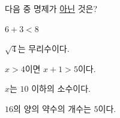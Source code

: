 다음 중 명제가 \underline{아닌} 것은?
\begin{choicesv}{\rule[-3ex]{0pt}{8ex}$6+3<8$}{\rule[-3ex]{0pt}{8ex}$\sqrt{4}$는 무리수이다.}{\rule[-3ex]{0pt}{8ex}$x>4$이면 $x+1>5$이다.}{\rule[-3ex]{0pt}{8ex}$x$는 $10$ 이하의 소수이다.}{\rule[-3ex]{0pt}{8ex}$16$의 양의 약수의 개수는 $5$이다.}\end{choicesv}
